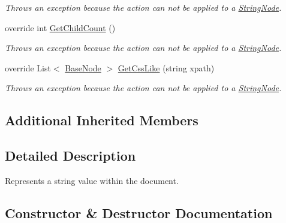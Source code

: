 \begin{DoxyCompactItemize}
\begin{DoxyCompactList}\small\item\em Throws an exception because the action can not be applied to a \hyperlink{class_x_m_leru_handleru_1_1_string_node}{String\+Node}. \end{DoxyCompactList}\item 
\hypertarget{class_x_m_leru_handleru_1_1_string_node_ac603663bb62e5c3dbb4f99b5167c6ba6}{}override int \hyperlink{class_x_m_leru_handleru_1_1_string_node_ac603663bb62e5c3dbb4f99b5167c6ba6}{Get\+Child\+Count} ()\label{class_x_m_leru_handleru_1_1_string_node_ac603663bb62e5c3dbb4f99b5167c6ba6}

\begin{DoxyCompactList}\small\item\em Throws an exception because the action can not be applied to a \hyperlink{class_x_m_leru_handleru_1_1_string_node}{String\+Node}. \end{DoxyCompactList}\item 
\hypertarget{class_x_m_leru_handleru_1_1_string_node_af1a0f24fafb8da6a57e72c951bb16dc1}{}override List$<$ \hyperlink{class_x_m_leru_handleru_1_1_base_node}{Base\+Node} $>$ \hyperlink{class_x_m_leru_handleru_1_1_string_node_af1a0f24fafb8da6a57e72c951bb16dc1}{Get\+Css\+Like} (string xpath)\label{class_x_m_leru_handleru_1_1_string_node_af1a0f24fafb8da6a57e72c951bb16dc1}

\begin{DoxyCompactList}\small\item\em Throws an exception because the action can not be applied to a \hyperlink{class_x_m_leru_handleru_1_1_string_node}{String\+Node}. \end{DoxyCompactList}\end{DoxyCompactItemize}
\subsection*{Additional Inherited Members}


\subsection{Detailed Description}
Represents a string value within the document. 

\subsection{Constructor \& Destructor Documentation}
\hypertarget{class_x_m_leru_handleru_1_1_string_node_a4c1eafc0ac995e89ef5a4af85c0f9c19}{}
